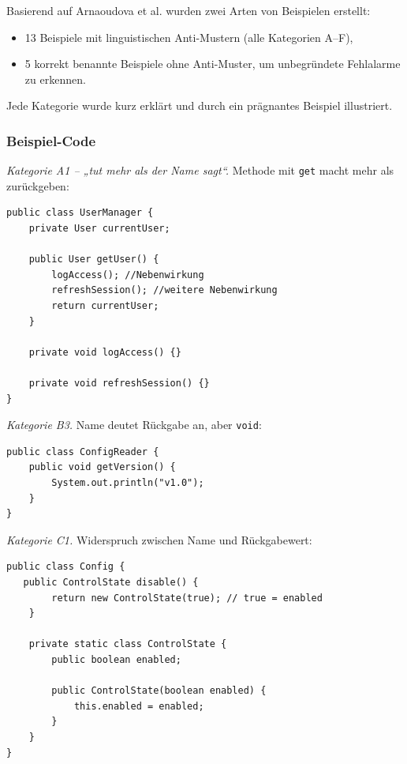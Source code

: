 \documentclass[a4paper,12pt]{article}
\begin{document}
Basierend auf Arnaoudova et al. \cite{arnaoudova2014} wurden zwei Arten von
Beispielen erstellt:

\begin{itemize}
    \item 13 Beispiele mit linguistischen Anti-Mustern (alle Kategorien A–F),
    \item 5 korrekt benannte Beispiele ohne Anti-Muster, um unbegründete Fehlalarme zu erkennen.
\end{itemize}

Jede Kategorie wurde kurz erklärt und durch ein prägnantes Beispiel
illustriert.

\subsubsection{Beispiel-Code}

\textit{Kategorie A1 – „tut mehr als der Name sagt“.} Methode mit \texttt{get} macht mehr als zurückgeben:

\begin{lstlisting}
public class UserManager {
    private User currentUser;

    public User getUser() {
        logAccess(); //Nebenwirkung
        refreshSession(); //weitere Nebenwirkung
        return currentUser;
    }
    
    private void logAccess() {}
    
    private void refreshSession() {}
}
\end{lstlisting}

\textit{Kategorie B3.} Name deutet Rückgabe an, aber \texttt{void}:

\begin{lstlisting}
public class ConfigReader {
    public void getVersion() {
        System.out.println("v1.0");
    }
}
\end{lstlisting}

\textit{Kategorie C1.} Widerspruch zwischen Name und Rückgabewert:

\begin{lstlisting}
public class Config {
   public ControlState disable() {
        return new ControlState(true); // true = enabled
    }

    private static class ControlState {
        public boolean enabled;

        public ControlState(boolean enabled) {
            this.enabled = enabled;
        }
    }
}
\end{lstlisting}
\end{document}
